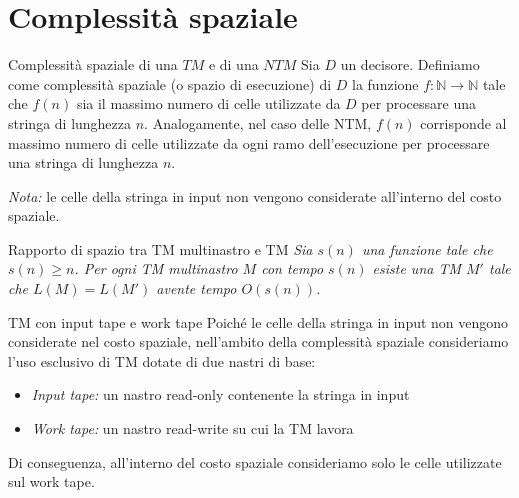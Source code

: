 \chapter{Complessità spaziale}
\begin{Definition}{Complessità spaziale di una $TM$ e di una $NTM$}{}
Sia $D$ un decisore. Definiamo come complessità spaziale (o spazio di esecuzione) di $D$ la funzione $f : \mathbb{N}\to \mathbb{N}$ tale che $f(n)$ sia il massimo numero di celle utilizzate da $D$ per processare una stringa di lunghezza $n$. Analogamente, nel caso delle NTM, $f(n)$ corrisponde al massimo numero di celle utilizzate da ogni ramo dell’esecuzione per processare una stringa di lunghezza $n$.

\textit{Nota:} le celle della stringa in input non vengono considerate all’interno del costo spaziale.
\end{Definition}

\begin{Thm}{Rapporto di spazio tra TM multinastro e TM}{}
\textit{Sia $s(n)$ una funzione tale che $s(n)\geq n$. Per ogni TM multinastro $M$ con tempo $s(n)$ esiste una TM $M'$ tale che $L(M) = L(M')$ avente tempo $O(s(n))$.}
\end{Thm}

\begin{Osservation}{TM con input tape e work tape}{}
Poiché le celle della stringa in input non vengono considerate nel costo spaziale, nell’ambito della complessità spaziale consideriamo l’uso esclusivo di TM dotate di due nastri di base:
\begin{itemize}
    \item \textit{Input tape:} un nastro read-only contenente la stringa in input
    \item \textit{Work tape:} un nastro read-write su cui la TM lavora
\end{itemize}
Di conseguenza, all’interno del costo spaziale consideriamo solo le celle utilizzate sul work tape.    
\end{Osservation}

